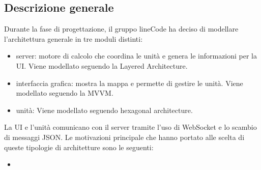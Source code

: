 \subsection{Descrizione generale}
Durante la fase di progettazione, il gruppo lineCode ha deciso di modellare l'architettura generale in tre moduli distinti:
\begin{itemize}
	\item server: motore di calcolo che coordina le unità e genera le informazioni per la UI. Viene modellato seguendo la Layered Architecture.
	\item interfaccia grafica: mostra la mappa e permette di gestire le unità. Viene modellato seguendo la MVVM.
	\item unità: Viene modellato seguendo hexagonal architecture. 
\end{itemize}
La UI e l'unità comunicano con il server tramite l'uso di WebSocket e lo scambio di messaggi JSON.
Le motivazioni principale che hanno portato alle scelta di queste tipologie di architetture sono le seguenti:
\begin{itemize}
	\item
\end{itemize}

